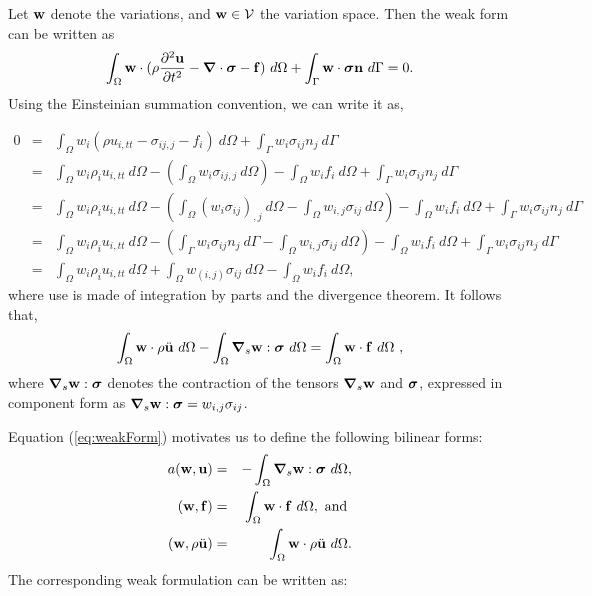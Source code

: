 \documentclass[10pt]{article}
\begin{document}
Let $\mathbf{w}$ denote the variations, and $\mathbf{w} \in \mathcal{V}$ the variation space.
Then the weak form can be written as
\begin{equation}
\int_{\Omega} \mathbf{w}\cdot(\rho\frac{\partial^2 \mathbf{u}}{\partial t^2}-{\boldsymbol{\nabla}}\cdot{\boldsymbol{\sigma}} -\mathbf{f})~d\Omega + \int_{\Gamma} \mathbf{w}\cdot{\boldsymbol{\sigma}}\mathbf{n}~d\Gamma = 0.
\end{equation}
Using the Einsteinian summation convention, we can write it as,

\begin{eqnarray}
  0 & = & \int_{\Omega} w_i ( \rho u_{i, t t} - \sigma_{i j, j} - f_i )~d\Omega + \int_{\Gamma} w_i \sigma_{ij} n_j~d \Gamma \nonumber\\
	& = & \int_{\Omega} w_i \rho_i u_{i, t t}~d\Omega - 	
	\left(	\int_{\Omega} w_i\sigma_{ij,j}~d\Omega \right) -
  \int_{\Omega} w_i f_i~d\Omega + \int_{\Gamma} w_i \sigma_{ij} n_j~d\Gamma \nonumber\\
  & = & \int_{\Omega} w_i \rho_i u_{i, t t}~d\Omega - 	
	\left(	\int_{\Omega} (w_i\sigma_{ij})_{,j}~d\Omega - \int_{\Omega} w_{i,j}\sigma_{ij}~d\Omega \right) -
  \int_{\Omega} w_i f_i~d\Omega + \int_{\Gamma} w_i \sigma_{ij} n_j~d\Gamma \nonumber\\
	& = & \int_{\Omega} w_i \rho_i u_{i, t t}~d\Omega - 	
	\left( \int_{\Gamma} w_i \sigma_{ij} n_j~d\Gamma - \int_{\Omega} w_{i, j}\sigma_{ij}~d\Omega \right) -
  \int_{\Omega} w_i f_i~d\Omega + \int_{\Gamma} w_i \sigma_{ij} n_j~d\Gamma \nonumber\\
  & = & \int_{\Omega} w_i \rho_i u_{i, t t}~d\Omega + \int_{\Omega} w_{( i, j )} \sigma_{ij}~d\Omega - \int_{\Omega} w_i f_i~d\Omega,
\end{eqnarray}
where use is made of integration by parts and the divergence theorem. It follows that,
\begin{equation}
\label{eq:weakForm}
\int_{\Omega} \mathbf{w}\cdot\rho\ddot{\mathbf{u}} ~d\Omega - \int_{\Omega}{\boldsymbol{\nabla}}_s\mathbf{w}:{\boldsymbol{\sigma}} ~d\Omega = \int_{\Omega} \mathbf{w}\cdot\mathbf{f} ~d\Omega ~,
\end{equation}
where ${\boldsymbol{\nabla}}_s\mathbf{w}:{\boldsymbol{\sigma}}$ denotes the contraction of the tensors ${\boldsymbol{\nabla}}_s\mathbf{w}$ and ${\boldsymbol{\sigma}}$, expressed in component form as ${\boldsymbol{\nabla}}_s\mathbf{w}:{\boldsymbol{\sigma}}=w_{i,j}\sigma_{ij}$.

Equation (\ref{eq:weakForm}) motivates us to define the following bilinear forms:
\begin{eqnarray}
  a (\bw,\bu) & = & -\int_{\Omega}\div_s\bw:\stress ~d\Omega, \label{eq:bilinear} \\ %
  (\bw,\force) & = & \int_{\Omega} \bw\cdot\force ~d\Omega, ~\mbox{and}~ \\ %
  (\bw, \rho \ddot{\bu} ) & = & \int_{\Omega} \bw\cdot\rho\ddot{\bu} ~d\Omega. %
\end{eqnarray}
The corresponding weak formulation can be written as:
\end{document}
